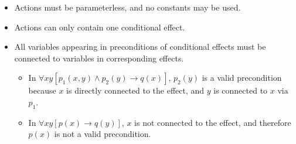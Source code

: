 \documentclass[../master.tex]{subfiles}
\begin{document}
\begin{itemize}
    \item Actions must be parameterless, and no constants may be used.
    \item Actions can only contain one conditional effect.
    \item All variables appearing in preconditions of conditional effects must be connected to variables in corresponding effects.

    \begin{itemize}
        \item In $\forall x y \left[ p_1(x, y) \land p_2(y) \rightarrow q(x) \right]$, $p_2(y)$ is a valid precondition because $x$ is directly connected to the effect, and $y$ is connected to $x$ via $p_1$.
        \item In $\forall x y \left[ p(x) \rightarrow q(y) \right]$, $x$ is not connected to the effect, and therefore $p(x)$ is not a valid precondition.
    \end{itemize}

\end{itemize}
\end{document}
